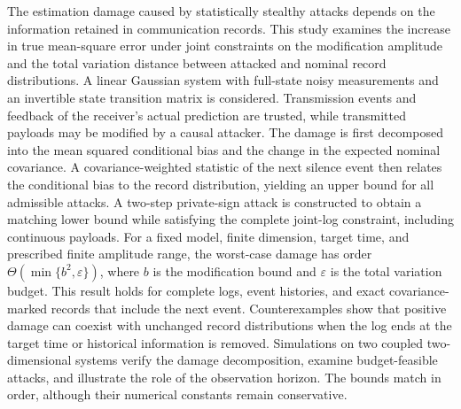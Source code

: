 The estimation damage caused by statistically stealthy attacks depends on the information retained in communication records. This study examines the increase in true mean-square error under joint constraints on the modification amplitude and the total variation distance between attacked and nominal record distributions. A linear Gaussian system with full-state noisy measurements and an invertible state transition matrix is considered. Transmission events and feedback of the receiver's actual prediction are trusted, while transmitted payloads may be modified by a causal attacker. The damage is first decomposed into the mean squared conditional bias and the change in the expected nominal covariance. A covariance-weighted statistic of the next silence event then relates the conditional bias to the record distribution, yielding an upper bound for all admissible attacks. A two-step private-sign attack is constructed to obtain a matching lower bound while satisfying the complete joint-log constraint, including continuous payloads. For a fixed model, finite dimension, target time, and prescribed finite amplitude range, the worst-case damage has order $\Theta(\min\{b^2,\varepsilon\})$, where $b$ is the modification bound and $\varepsilon$ is the total variation budget. This result holds for complete logs, event histories, and exact covariance-marked records that include the next event. Counterexamples show that positive damage can coexist with unchanged record distributions when the log ends at the target time or historical information is removed. Simulations on two coupled two-dimensional systems verify the damage decomposition, examine budget-feasible attacks, and illustrate the role of the observation horizon. The bounds match in order, although their numerical constants remain conservative.
